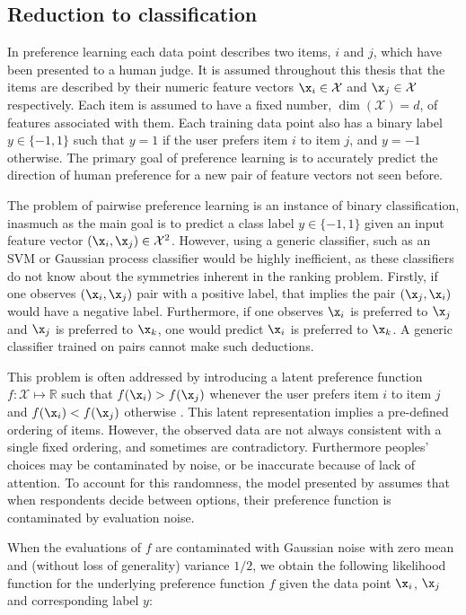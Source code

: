 \subsection{Reduction to classification\label{sec:prefKernel}}

In preference learning each data point describes two items, $i$ and $j$, which have been presented to a human judge. It is assumed throughout this thesis that the items are described by their numeric feature vectors $\x_i\in\mathcal{X}$ and $\x_j\in\mathcal{X}$ respectively. Each item is assumed to have a fixed number, $\dim(\mathcal{X})=d$, of features associated with them. Each training data point also has a binary label $y\in\{-1,1\}$ such that $y=1$ if the user prefers item $i$ to item $j$, and $y=-1$ otherwise. The primary goal of preference learning is to accurately predict the direction of human preference for a new pair of feature vectors not seen before.

The problem of pairwise preference learning is an instance of binary classification, inasmuch as the main goal is to predict a class label $y\in\{-1,1\}$ given an input feature vector $(\x_i,\x_j)\in\mathcal{X}^2$. However, using a generic classifier, such as an SVM or Gaussian process classifier would be highly inefficient, as these classifiers do not know about the symmetries inherent in the ranking problem. Firstly, if one observes $(\x_i,\x_j)$ pair with a positive label, that implies the pair $(\x_j,\x_i)$ would have a negative label. Furthermore, if one observes $\x_i$ is preferred to $\x_j$ and $\x_j$ is preferred to $\x_k$, one would predict $\x_i$ is preferred to $\x_k$. A generic classifier trained on pairs cannot make such deductions.

This problem is often addressed by introducing a latent preference function $f:\mathcal{X}\mapsto \mathbb{R}$ such that
$f(\x_i) > f(\x_j)$ whenever the user prefers item $i$ to item $j$ and $f(\x_i) < f(\x_j)$ otherwise \citep{Chu2005}. This latent representation implies a pre-defined ordering of items. However, the observed data are not always consistent with a single fixed ordering, and sometimes are contradictory. Furthermore peoples' choices may be contaminated by noise, or be inaccurate because of lack of attention. To account for this randomness, the model presented by \citep{Chu2005} assumes that when respondents decide between options, their preference function is contaminated by evaluation noise.

When the evaluations of $f$ are contaminated with Gaussian noise with zero mean and (without loss of generality) variance $1/2$, we obtain the following likelihood function for the underlying preference function $f$ given the data point $\x_i$, $\x_j$ and corresponding label $y$:

